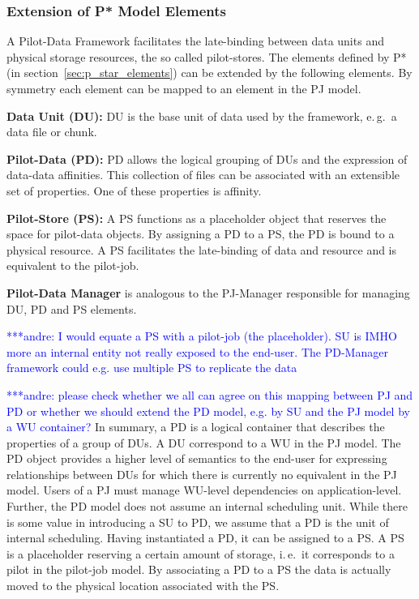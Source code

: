 \documentclass[conference,final]{IEEEtran}
\newcommand{\jhanote}[1]{ {\textcolor{red} { ***shantenu: #1 }}}
\newcommand{\alnote}[1]{ {\textcolor{blue} { ***andre: #1 }}}
\newcommand{\alnote}[1]{}
\newcommand{\jhanote}[1]{}
\begin{document}
\subsubsection*{Extension of P* Model Elements}


A Pilot-Data Framework facilitates the late-binding between data units and
physical storage resources, the so called pilot-stores. The elements defined by
P* (in section~\ref{sec:p_star_elements}) can be extended by the following
elements. By symmetry each element can be mapped to an element in the PJ model.
\begin{compactenum}[A.]
\item \textbf{Data Unit (DU):} DU is the base unit of data used by the framework,
  e.\,g.\ a data file or chunk. 
\item \textbf{Pilot-Data (PD):} PD allows the logical grouping of DUs
  and the expression of data-data affinities. This collection of files
  can be associated with an extensible set of properties. One of these
  properties is affinity. 
\item \textbf{Pilot-Store (PS):} A PS functions as a
	  placeholder object that reserves the space for pilot-data objects. 
	  By assigning a PD to a PS, the PD is bound to a physical resource.
	  A PS facilitates the late-binding of data and resource and is equivalent 
	  to the pilot-job.
\item \textbf{Pilot-Data Manager} is analogous to the PJ-Manager responsible for 
  managing DU, PD and PS elements. 
\end{compactenum}

\alnote{I would equate a PS with a pilot-job (the placeholder). SU is
  IMHO more an internal entity not really exposed to the end-user. The
  PD-Manager framework could e.g. use multiple PS to replicate the
  data}

\alnote{please check whether we all can agree on this mapping between PJ and PD or whether we should extend the PD model, e.g. by SU and the PJ model by a WU container?}
In summary, a PD is a logical container that describes the properties of a group
of DUs. A DU correspond to a WU in the PJ model. The PD object provides a higher
level of semantics to the end-user for expressing relationships between DUs for
which there is currently no equivalent in the PJ model. Users of a PJ must
manage WU-level dependencies on application-level. Further, the PD model does
not assume an internal scheduling unit. While there is some value in introducing
a SU to PD, we assume that a PD is the unit of internal scheduling. Having
instantiated a PD, it can be assigned to a PS. A PS is a placeholder reserving a
certain amount of storage, i.\,e.\ it corresponds to a pilot in the pilot-job
model. By associating a PD to a PS the data is actually moved to the physical
location associated with the PS.
\end{document}
